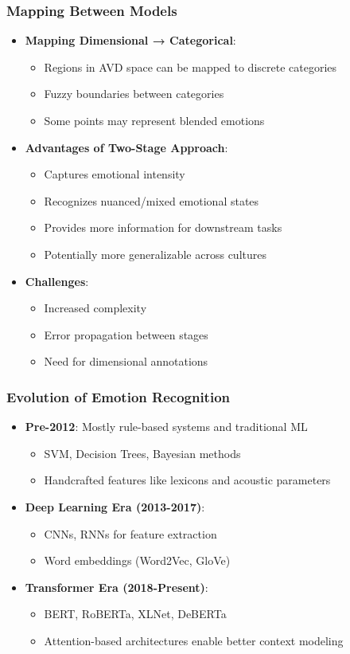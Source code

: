 \documentclass{beamer}
\begin{document}
\begin{frame}
\frametitle{Mapping Between Models}
\begin{itemize}
    \item \textbf{Mapping Dimensional → Categorical}:
    \begin{itemize}
        \item Regions in AVD space can be mapped to discrete categories
        \item Fuzzy boundaries between categories
        \item Some points may represent blended emotions
    \end{itemize}
    \item \textbf{Advantages of Two-Stage Approach}:
    \begin{itemize}
        \item Captures emotional intensity
        \item Recognizes nuanced/mixed emotional states
        \item Provides more information for downstream tasks
        \item Potentially more generalizable across cultures
    \end{itemize}
    \item \textbf{Challenges}:
    \begin{itemize}
        \item Increased complexity
        \item Error propagation between stages
        \item Need for dimensional annotations
    \end{itemize}
\end{itemize}
\end{frame}

\begin{frame}
\frametitle{Evolution of Emotion Recognition}
\begin{itemize}
    \item \textbf{Pre-2012}: Mostly rule-based systems and traditional ML
    \begin{itemize}
        \item SVM, Decision Trees, Bayesian methods
        \item Handcrafted features like lexicons and acoustic parameters
    \end{itemize}
    \item \textbf{Deep Learning Era (2013-2017)}: 
    \begin{itemize}
        \item CNNs, RNNs for feature extraction
        \item Word embeddings (Word2Vec, GloVe)
    \end{itemize}
    \item \textbf{Transformer Era (2018-Present)}:
    \begin{itemize}
        \item BERT, RoBERTa, XLNet, DeBERTa
        \item Attention-based architectures enable better context modeling
    \end{itemize}
\end{itemize}
\end{frame}
\end{document}
